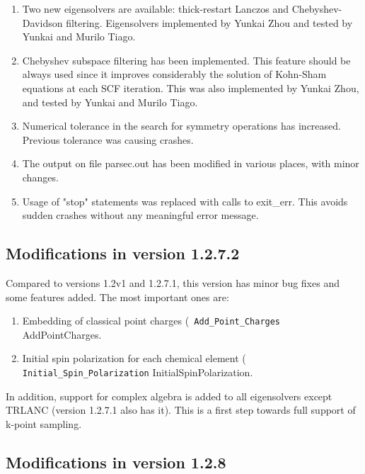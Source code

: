 \documentclass{article}
\begin{document}
\begin{enumerate}
\item Two new eigensolvers are available: thick-restart Lanczos and
  Chebyshev-Davidson filtering. Eigensolvers implemented by Yunkai
  Zhou and tested by Yunkai and Murilo Tiago.

\item Chebyshev subspace filtering has been implemented. 
This feature should be always used since it improves considerably 
the solution of Kohn-Sham
equations at each SCF iteration. This was also implemented by Yunkai
  Zhou, and tested by Yunkai and Murilo Tiago.

\item Numerical tolerance in the search for symmetry operations has
  increased. Previous tolerance was causing crashes.

\item The output on file parsec.out has been modified in various places,
with minor changes.

\item Usage of "stop" statements was replaced with calls to exit\_err. This
avoids sudden crashes without any meaningful error message.
\end{enumerate}

\subsection{Modifications in version 1.2.7.2}

Compared to versions 1.2v1 and 1.2.7.1, this version has minor bug fixes and some
features added. The most important ones are:

\begin{enumerate}
\item Embedding of classical point charges ({\tt
  Add\_Point\_Charges} {AddPointCharges}.

\item Initial spin polarization for each chemical element ({\tt
  Initial\_Spin\_Polarization} {InitialSpinPolarization}.
\end{enumerate}

In addition, support for complex algebra is added to all eigensolvers
except TRLANC (version 1.2.7.1 also has it). This is a first step towards full support of k-point
sampling.

\subsection{Modifications in version 1.2.8}
\end{document}
